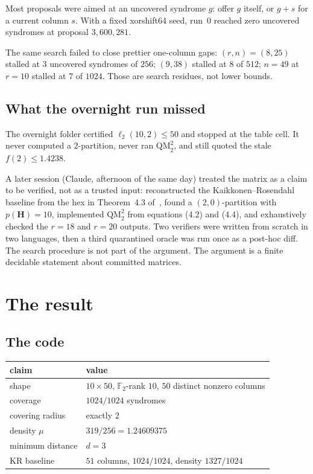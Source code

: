 \documentclass[11pt,a4paper]{article}
\newcommand{\FF}{\mathbb{F}}
\newcommand{\HH}{\boldsymbol{H}}
\newcommand{\ellr}{\ell_2}
\begin{document}
Most proposals were aimed at an uncovered syndrome $g$: offer $g$ itself,
or $g+s$ for a current column $s$. With a fixed xorshift64 seed, run~$0$
reached zero uncovered syndromes at proposal $3{,}600{,}281$.

The same search failed to close prettier one-column gaps:
$(r,n)=(8,25)$ stalled at $3$ uncovered syndromes of $256$;
$(9,38)$ stalled at $8$ of $512$; $n=49$ at $r=10$ stalled at $7$ of
$1024$. Those are search residues, not lower bounds.

\subsection{What the overnight run missed}

The overnight folder certified $\ellr(10,2)\le 50$ and stopped at the
table cell. It never computed a $2$-partition, never ran
$\mathrm{QM}_2^2$, and still quoted the stale $f(2)\le 1.4238$.

A later session (Claude, afternoon of the same day) treated the matrix as
a claim to be verified, not as a trusted input: reconstructed the
Kaikkonen--Rosendahl baseline from the hex in Theorem~4.3 of~\cite{DMP2025},
found a $(2,0)$-partition with $p(\HH)=10$, implemented
$\mathrm{QM}_2^2$ from equations (4.2) and (4.4), and exhaustively checked
the $r=18$ and $r=20$ outputs. Two verifiers were written from scratch in
two languages, then a third quarantined oracle was run once as a post-hoc
diff. The search procedure is not part of the argument. The argument is a
finite decidable statement about committed matrices.

\section{The result}

\subsection{The code}

\begin{center}
\renewcommand{\arraystretch}{1.15}
\begin{tabular}{@{}ll@{}}
\toprule
claim & value \\
\midrule
shape & $10\times 50$, $\FF_2$-rank $10$, $50$ distinct nonzero columns \\
coverage & $1024/1024$ syndromes \\
covering radius & exactly $2$ \\
density $\mu$ & $319/256=1.24609375$ \\
minimum distance & $d=3$ \\
KR baseline & $51$ columns, $1024/1024$, density $1327/1024$ \\
\bottomrule
\end{tabular}
\end{center}
\end{document}
